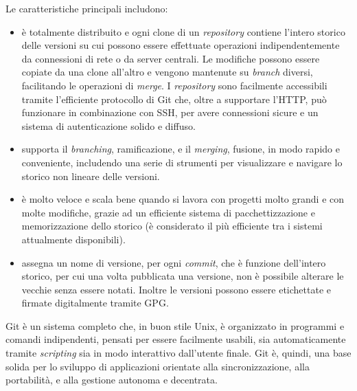 Le caratteristiche principali includono:
\begin{itemize}
\item è totalmente distribuito e ogni clone di un
  \emph{repository} contiene l'intero storico delle versioni su cui
  possono essere effettuate operazioni indipendentemente da
  connessioni di rete o da server centrali. Le modifiche possono
  essere copiate da una clone all'altro e vengono mantenute su
  \emph{branch} diversi, facilitando le operazioni di \emph{merge}. I
  \emph{repository} sono facilmente accessibili tramite l'efficiente
  protocollo di Git che, oltre a supportare l'HTTP, può funzionare in
  combinazione con SSH, per avere connessioni sicure e un sistema di
  autenticazione solido e diffuso.
\item supporta il \emph{branching}, ramificazione, e il
  \emph{merging}, fusione, in modo rapido e conveniente, includendo
  una serie di strumenti per visualizzare e navigare lo storico non
  lineare delle versioni.
\item è molto veloce e scala bene quando si lavora con progetti
  molto grandi e con molte modifiche, grazie ad un efficiente sistema
  di pacchettizzazione e memorizzazione dello storico (è considerato
  il più efficiente tra i sistemi attualmente disponibili).
\item assegna un nome di versione, per ogni \emph{commit},
  che è funzione dell'intero storico, per cui una volta pubblicata una
  versione, non è possibile alterare le vecchie senza essere
  notati. Inoltre le versioni possono essere etichettate e firmate
  digitalmente tramite GPG.
\end{itemize}

Git è un sistema completo che, in buon stile Unix, è organizzato in
programmi e comandi indipendenti, pensati per essere facilmente
usabili, sia automaticamente tramite \emph{scripting} sia in modo
interattivo dall'utente finale. Git è, quindi, una base solida per lo
sviluppo di applicazioni orientate alla sincronizzazione, alla
portabilità, e alla gestione autonoma e decentrata.


